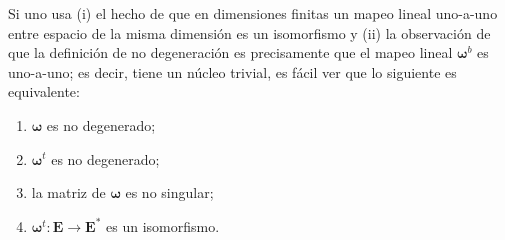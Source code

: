\documentclass[a4paper,10pt]{article}
\numberwithin{equation}{section}
\begin{document}
Si uno usa (i) el hecho de que en dimensiones finitas un mapeo lineal uno-a-uno 
entre espacio de la misma dimensión es un isomorfismo y (ii) la observación de 
que la definición de no degeneración es precisamente que el mapeo lineal $\mathbf{\omega}^b$ 
es uno-a-uno; es decir, tiene un núcleo trivial, es fácil ver que lo siguiente 
es equivalente:

\begin{enumerate}[label=({\roman*})]
 \item $\mathbf{\omega}$ es no degenerado;
 \item $\mathbf{\omega}^t$ es no degenerado;
 \item la matriz de $\mathbf{\omega}$ es no singular;
 \item $\mathbf{\omega}^t:\mathbf{E} \rightarrow \mathbf{E}^*$ es un isomorfismo.
\end{enumerate}
\end{document}
